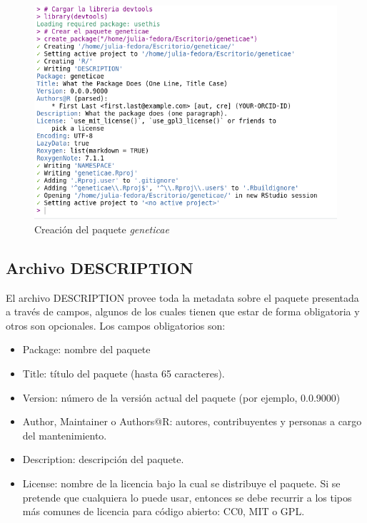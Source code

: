 \begin{figure}[H]
	\begin{center}
		\includegraphics[width=13cm]{./Graficos/creacion.png}	
	\end{center}
	\caption{Creación del paquete \emph{geneticae}}
	\label{fig:fig32}
\end{figure}


\subsection{Archivo DESCRIPTION}
\label{subsec:description}
El archivo DESCRIPTION provee toda la metadata sobre el paquete presentada a través de campos, algunos de los cuales tienen que estar de forma obligatoria y otros son opcionales. Los campos obligatorios son: 

\begin{itemize}
\item Package: nombre del paquete
\item Title: título del paquete (hasta 65 caracteres).
\item Version: número de la versión actual del paquete (por ejemplo, 0.0.9000)
\item Author, Maintainer o Authors@R: autores, contribuyentes y personas a cargo del mantenimiento.
\item Description: descripción del paquete.
\item License: nombre de la licencia bajo la cual se distribuye el paquete. Si se pretende que cualquiera lo puede usar, entonces se debe recurrir a los tipos más comunes de licencia para código abierto: CC0, MIT o GPL. 
\end{itemize}

